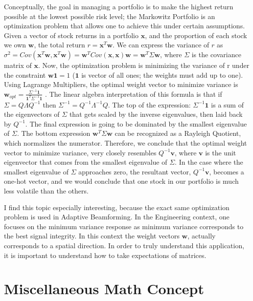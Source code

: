 \documentclass[final]{siamart1116}
\begin{document}
Conceptually, the goal in managing a portfolio is to make the highest return possible at the lowest possible risk level; the Markowitz Portfolio is an optimization problem that allows one to achieve this under certain assumptions. Given a vector of stock returns in a portfolio $\textbf{x}$, and the proportion of each stock we own $\textbf{w}$, the total return $r = \textbf{x}^{T}\textbf{w}$. We can express the variance of $r$ as $\sigma^2 = Cov(\textbf{x}^{T}\textbf{w},\textbf{x}^{T}\textbf{w}) = \textbf{w}^{T}Cov(\textbf{x}, \textbf{x})\textbf{w} = \textbf{w}^{T}\Sigma\textbf{w}$, where $\Sigma$ is the covariance matrix of $\textbf{x}$. Now, the optimization problem is minimizing the variance of r under the constraint $\textbf{w}\textbf{1} = 1$ ($\textbf{1}$ is vector of all ones; the weights must add up to one). Using Lagrange Multipliers, the optimal weight vector to minimize variance is $\textbf{w}_{opt} = \frac{\Sigma^{-1}\textbf{1}}{\textbf{1}^{T}\Sigma^{-1}\textbf{1}}$ \cite{utah_lecture}. The linear algebra interpretation of this formula is that if $\Sigma = Q \Lambda Q^{-1}$ then $\Sigma^{-1} = Q^{-1} \Lambda^{-1} Q$. The top of the expression: $\Sigma^{-1}\textbf{1}$ is a sum of the eigenvectors of $\Sigma$ that gets scaled by the inverse eigenvalues, then laid back by $Q^{-1}$. The final expression is going to be dominated by the smallest eigenvalue of $\Sigma$. The bottom expression $\textbf{w}^{T}\Sigma\textbf{w}$ can be recognized as a Rayleigh Quotient, which normalizes the numerator. Therefore, we conclude that the optimal weight vector to minimize variance, very closely resembles $Q^{-1}\textbf{v}$, where $\textbf{v}$ is the unit eigenvector that comes from the smallest eigenvalue of $\Sigma$. In the case where the smallest eigenvalue of $\Sigma$ approaches zero, the resultant vector, $Q^{-1}\textbf{v}$, becomes a one-hot vector, and we would conclude that one stock in our portfolio is much less volatile than the others.

I find this topic especially interesting, because the exact same optimization problem is used in Adaptive Beamforming. In the Engineering context, one focuses on the minimum variance response as minimum variance corresponds to the best signal integrity. In this context the weight vectors $\textbf{w}$, actually corresponds to a spatial direction. In order to truly understand this application, it is important to understand how to take expectations of matrices.

\section{Miscellaneous Math Concept}
\end{document}
